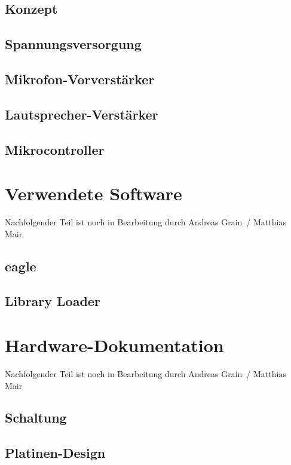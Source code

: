 \documentclass[a4paper, twoside, 12pt, openright
]{memoir}
\newcommand{\AndreasGrain}{Andreas Grain}
\newcommand{\MatthiasMair}{Matthias Mair}
\newcommand{\authorName}{\AndreasGrain\ / \MatthiasMair}
\newcommand{\wip}{{\color{red}Nachfolgender Teil ist noch in Bearbeitung durch \authorName}}
\begin{document}
\section{Konzept}
\section{Spannungsversorgung}
\section{Mikrofon-Vorverstärker}
\section{Lautsprecher-Verstärker}
\section{Mikrocontroller}

\chapter{Verwendete Software}
\wip
\section{\acs{eagle}}
\section{Library Loader}

\chapter{Hardware-Dokumentation}
\wip
\section{Schaltung}
\section{Platinen-Design}

\end{document}
